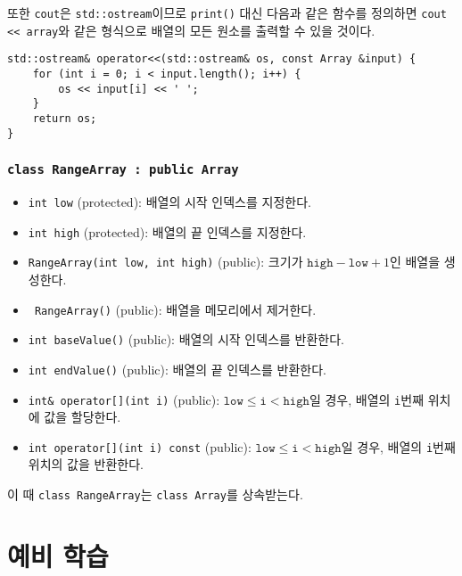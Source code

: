 \documentclass[runningheads]{../../../llncs}
\begin{document}
또한 \texttt{cout}은 \texttt{std::ostream}이므로 \texttt{print()} 대신 다음과 같은 함수를 정의하면 \texttt{cout << array}와 같은 형식으로 배열의 모든 원소를 출력할 수 있을 것이다.
\begin{verbatim}
std::ostream& operator<<(std::ostream& os, const Array &input) {
    for (int i = 0; i < input.length(); i++) {
        os << input[i] << ' ';
    }
    return os;
}
\end{verbatim}

\subsubsection{\texttt{class RangeArray : public Array}}

\begin{itemize}
	\item \texttt{int low} (protected): 배열의 시작 인덱스를 지정한다.
	\item \texttt{int high} (protected): 배열의 끝 인덱스를 지정한다.
	\item \texttt{RangeArray(int low, int high)} (public): 크기가 $\texttt{high} - \texttt{low} + 1$인 배열을 생성한다.
	\item \texttt{~RangeArray()} (public): 배열을 메모리에서 제거한다.
	\item \texttt{int baseValue()} (public): 배열의 시작 인덱스를 반환한다.
	\item \texttt{int endValue()} (public): 배열의 끝 인덱스를 반환한다.
	\item \texttt{int& operator[](int i)} (public): $\texttt{low} \leq \texttt{i} < \texttt{high}$일 경우, 배열의 \texttt{i}번째 위치에 값을 할당한다.
	\item \texttt{int operator[](int i) const} (public): $\texttt{low} \leq \texttt{i} < \texttt{high}$일 경우, 배열의 \texttt{i}번째 위치의 값을 반환한다.
\end{itemize}

이 때 \texttt{class RangeArray}는 \texttt{class Array}를 상속받는다.

\newpage

\section{예비 학습}
\end{document}
